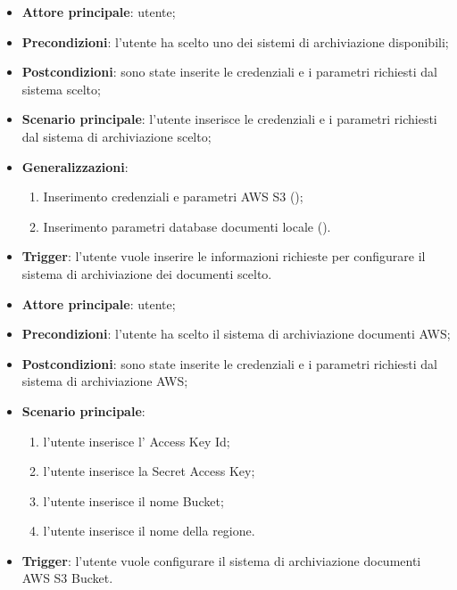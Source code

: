 \documentclass[10pt, a4paper]{article}
\begin{document}
    \begin{itemize}
        \item \textbf{Attore principale}: utente;
        \item \textbf{Precondizioni}: l’utente ha scelto uno dei sistemi di archiviazione disponibili;
        \item \textbf{Postcondizioni}: sono state inserite le credenziali e i parametri richiesti dal sistema scelto;
        \item \textbf{Scenario principale}: l’utente inserisce le credenziali e i parametri richiesti dal sistema di archiviazione scelto;
        \item \textbf{Generalizzazioni}:
            \begin{enumerate}
                \item Inserimento credenziali e parametri AWS S3 ();
                \item Inserimento parametri database documenti locale ().
            \end{enumerate}
        \item \textbf{Trigger}: l’utente vuole inserire le informazioni richieste per configurare il sistema di archiviazione dei documenti scelto.
    \end{itemize}

    \begin{itemize}
        \item \textbf{Attore principale}: utente;
        \item \textbf{Precondizioni}: l’utente ha scelto il sistema di archiviazione documenti AWS;
        \item \textbf{Postcondizioni}: sono state inserite le credenziali e i parametri richiesti dal sistema di archiviazione AWS;
        \item \textbf{Scenario principale}:
            \begin{enumerate}
                \item l’utente inserisce l’ Access Key Id;
                \item l’utente inserisce la Secret Access Key;
                \item l’utente inserisce il nome Bucket;
                \item l’utente inserisce il nome della regione.
            \end{enumerate}
        \item \textbf{Trigger}: l’utente vuole configurare il sistema di archiviazione documenti AWS S3 Bucket.
    \end{itemize}
    
\end{document}
